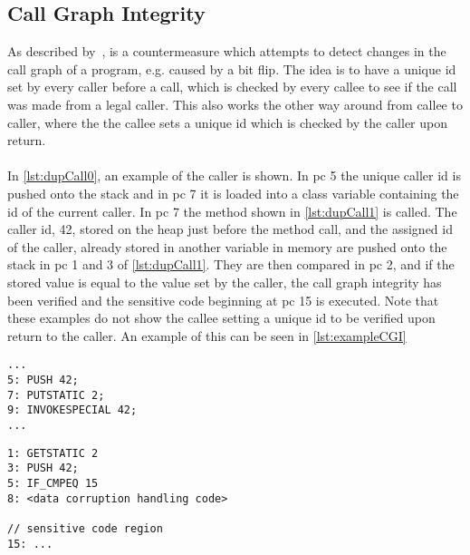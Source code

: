 \subsection{Call Graph Integrity} 
As described by~\cite{mksb}, is a countermeasure which attempts to detect changes in the call graph of a program, e.g. caused by a bit flip. The idea is to have a unique id set by every caller before a call, which is checked by every callee to see if the call was made from a legal caller. This also works the other way around from callee to caller, where the the callee sets a unique id which is checked by the caller upon return.\\\\
In \cref{lst:dupCall0}, an example of the caller is shown. In pc 5 the unique caller id is pushed onto the stack and in pc 7 it is loaded into a class variable containing the id of the current caller. In pc 7 the method shown in \cref{lst:dupCall1} is called. The caller id, 42, stored on the heap just before the method call, and the assigned id of the caller, already stored in another variable in memory are pushed onto the stack in pc 1 and 3 of \ref{lst:dupCall1}. They are then compared in pc 2, and if the stored value is equal to the value set by the caller, the call graph integrity has been verified and the sensitive code beginning at pc 15 is executed. Note that these examples do not show the callee setting a unique id to be verified upon return to the caller. An example of this can be seen in \cref{lst:exampleCGI}


\begin{lstlisting}[caption={Caller with call graph integrity implemented. The code is written in \jcl.},numbers=none, label={lst:dupCall0}]
...
5: PUSH 42; 
7: PUTSTATIC 2;
9: INVOKESPECIAL 42;
...
\end{lstlisting}

\newpage

\begin{lstlisting}[caption={Callee with call graph integrity implemented. The code is written in \jcl.},numbers=none, label={lst:dupCall1}]
1: GETSTATIC 2
3: PUSH 42;
5: IF_CMPEQ 15
8: <data corruption handling code>

// sensitive code region
15: ...
\end{lstlisting}
